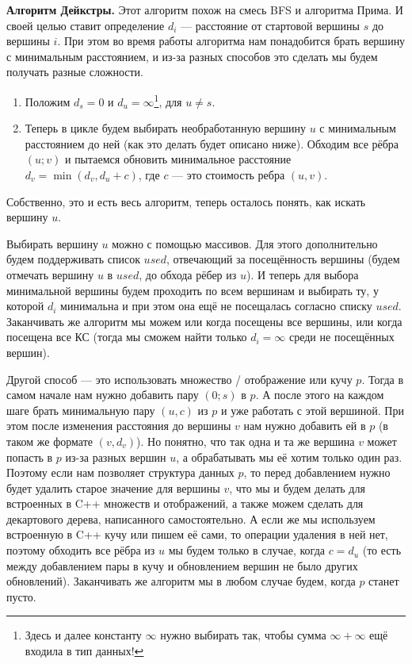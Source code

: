 \textbf{Алгоритм Дейкстры.} Этот алгоритм похож на смесь BFS и алгоритма Прима. И своей целью ставит определение $d_i$ — расстояние от стартовой вершины $s$ до вершины $i$. При этом во время работы алгоритма нам понадобится брать вершину с минимальным расстоянием, и из-за разных способов это сделать мы будем получать разные сложности.

\begin{enumerate}
    \item Положим $d_s = 0$ и $d_u = \infty$\footnote{Здесь и далее константу $\infty$ нужно выбирать так, чтобы сумма $\infty + \infty$ ещё входила в тип данных!}, для $u \ne s$.
    \item Теперь в цикле будем выбирать необработанную вершину $u$ с минимальным расстоянием до ней (как это делать будет описано ниже). Обходим все рёбра $(u; v)$ и пытаемся обновить минимальное расстояние $d_v = \min(d_v, d_u + c)$, где $c$ — это стоимость ребра $(u, v)$.
\end{enumerate}

Собственно, это и есть весь алгоритм, теперь осталось понять, как искать вершину $u$.

Выбирать вершину $u$ можно с помощью массивов. Для этого дополнительно будем поддерживать список $used$, отвечающий за посещённость вершины (будем отмечать вершину $u$ в $used$, до обхода рёбер из $u$). И теперь для выбора минимальной вершины будем проходить по всем вершинам и выбирать ту, у которой $d_i$ минимальна и при этом она ещё не посещалась согласно списку $used$. Заканчивать же алгоритм мы можем или когда посещены все вершины, или когда посещена все КС (тогда мы сможем найти только $d_i = \infty$ среди не посещённых вершин).

Другой способ — это использовать множество / отображение или кучу $p$. Тогда в самом начале нам нужно добавить пару $(0; s)$ в $p$. А после этого на каждом шаге брать минимальную пару $(u, c)$ из $p$ и уже работать с этой вершиной. При этом после изменения расстояния до вершины $v$ нам нужно добавить ей в $p$ (в таком же формате $(v, d_v)$). Но понятно, что так одна и та же вершина $v$ может попасть в $p$ из-за разных вершин $u$, а обрабатывать мы её хотим только один раз. Поэтому если нам позволяет структура данных $p$, то перед добавлением нужно будет удалить старое значение для вершины $v$, что мы и будем делать для встроенных в C++ множеств и отображений, а также можем сделать для декартового дерева, написанного самостоятельно. А если же мы используем встроенную в C++ кучу или пишем её сами, то операции удаления в ней нет, поэтому обходить все рёбра из $u$ мы будем только в случае, когда $c = d_u$ (то есть между добавлением пары в кучу и обновлением вершин не было других обновлений). Заканчивать же алгоритм мы в любом случае будем, когда $p$ станет пусто.

